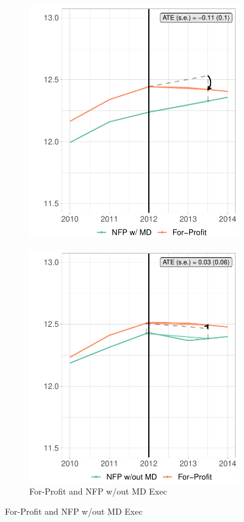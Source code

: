 \documentclass[12pt]{article}
\begin{document}
\begin{figure}
\begin{subfigure}[b]{0.45\textwidth}
         \includegraphics[width=\textwidth]{Objects/mort_fp_md_synth_graph.pdf}
         \label{fig:mort_synth_plotb}
     \end{subfigure}%
     \hfill
     \begin{subfigure}[b]{0.45\textwidth}
         \centering
         \caption{For-Profit and NFP w/out MD Exec}
         \includegraphics[width=\textwidth]{Objects/mort_fp_nomd_synth_graph.pdf}

\end{subfigure}
\end{figure}
\end{document}
